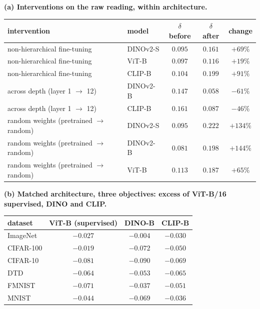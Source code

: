 \begin{table}[H]
\centering
\footnotesize
\setlength{\tabcolsep}{4pt}
\noindent\textbf{(a) Interventions on the raw reading, within architecture.}\par\vspace{1.5pt}
\begin{tabular}{llccc}
\toprule
intervention & model & $\delta$ before & $\delta$ after & change \\
\midrule
non-hierarchical fine-tuning & DINOv2-S & $0.095$ & $0.161$ & $+69\%$ \\
non-hierarchical fine-tuning & ViT-B & $0.097$ & $0.116$ & $+19\%$ \\
non-hierarchical fine-tuning & CLIP-B & $0.104$ & $0.199$ & $+91\%$ \\
\midrule
across depth (layer 1 $\to$ 12) & DINOv2-B & $0.147$ & $0.058$ & $-61\%$ \\
across depth (layer 1 $\to$ 12) & CLIP-B & $0.161$ & $0.087$ & $-46\%$ \\
\midrule
random weights (pretrained $\to$ random) & DINOv2-S & $0.095$ & $0.222$ & $+134\%$ \\
random weights (pretrained $\to$ random) & DINOv2-B & $0.081$ & $0.198$ & $+144\%$ \\
random weights (pretrained $\to$ random) & ViT-B & $0.113$ & $0.187$ & $+65\%$ \\
\bottomrule
\end{tabular}
\par\vspace{5pt}
\noindent\textbf{(b) Matched architecture, three objectives: excess of ViT-B/16 supervised, DINO and CLIP.}\par\vspace{1.5pt}
\begin{tabular}{lccc}
\toprule
dataset & ViT-B (supervised) & DINO-B & CLIP-B \\
\midrule
ImageNet & $-0.027$ & $-0.004$ & $-0.030$ \\
CIFAR-100 & $-0.019$ & $-0.072$ & $-0.050$ \\
CIFAR-10 & $-0.081$ & $-0.090$ & $-0.069$ \\
DTD & $-0.064$ & $-0.053$ & $-0.065$ \\
FMNIST & $-0.071$ & $-0.037$ & $-0.051$ \\
MNIST & $-0.044$ & $-0.069$ & $-0.036$ \\

\end{tabular}
\end{table}
